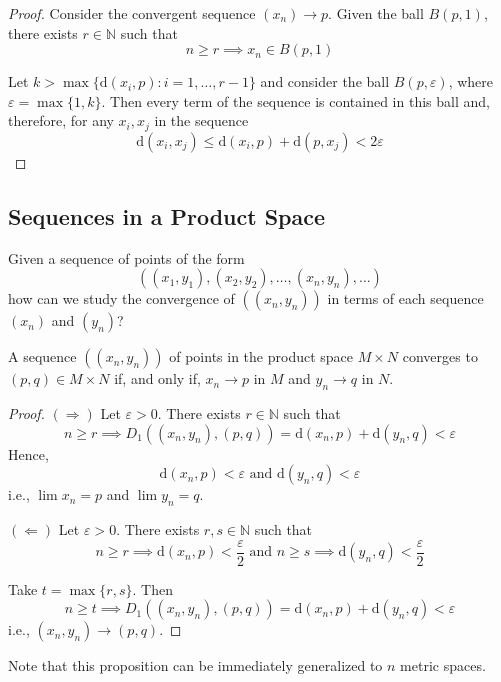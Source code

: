\begin{proof}
	Consider the convergent sequence $(x_n) \longrightarrow p$. Given the ball $B(p,1)$, there exists $r \in \mathbb{N}$ such that
	\[
		n \geq r \implies x_n \in B(p,1)
	\]

	Let $k > \max \{ \mathrm{d}(x_i, p) : i = 1, \ldots, r-1 \}$ and consider the ball $B(p, \varepsilon)$, where $\varepsilon = \max \{ 1, k \}$. Then every term of the sequence is contained in this ball and, therefore, for any $x_i, x_j$ in the sequence 
	\[
		\mathrm{d}(x_i, x_j) \leq \mathrm{d}(x_i, p) + \mathrm{d}(p, x_j) < 2 \varepsilon
	\]
\end{proof}

\subsection{Sequences in a Product Space}

Given a sequence of points of the form
\[
	((x_1, y_1), (x_2, y_2), \ldots, (x_n, y_n), \ldots)
\]
how can we study the convergence of $((x_n, y_n))$ in terms of each sequence $(x_n)$ and $(y_n)$?

\begin{proposition}
	A sequence $((x_n, y_n))$ of points in the product space $M \times N$ converges to $(p,q) \in M \times N$ if, and only if, $x_n \longrightarrow p$ in $M$ and $y_n \longrightarrow q$ in $N$.
\end{proposition}

\begin{proof}
	$(\Rightarrow)$ Let $\varepsilon > 0$. There exists $r \in \mathbb{N}$ such that
	\[
		n \geq r \implies D_1((x_n, y_n), (p, q)) = \mathrm{d}(x_n, p) + \mathrm{d}(y_n, q) < \varepsilon
	\]
	Hence,
	\[
		\mathrm{d}(x_n, p) < \varepsilon \text{ and } \mathrm{d}(y_n, q) < \varepsilon
	\]
	i.e., $\lim x_n = p$ and $\lim y_n = q$.

	$(\Leftarrow)$ Let $\varepsilon > 0$. There exists $r, s \in \mathbb{N}$ such that
	\[
		n \geq r \implies \mathrm{d}(x_n, p) < \frac{\varepsilon}{2} \text { and } n \geq s \implies \mathrm{d}(y_n, q) < \frac{\varepsilon}{2}
	\]

	Take $t = \max\{r, s\}$. Then
	\[
		n \geq t \implies D_1((x_n, y_n), (p, q)) = \mathrm{d}(x_n, p) + \mathrm{d}(y_n, q) < \varepsilon
	\]
	i.e., $(x_n, y_n) \longrightarrow (p,q)$.
\end{proof}

Note that this proposition can be immediately generalized to $n$ metric spaces.

